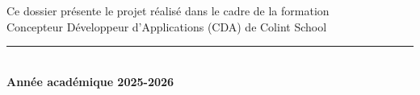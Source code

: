 \documentclass[11pt,a4paper]{book}
\begin{document}
\begin{titlepage}
    \vfill

    \begin{minipage}[b]{\textwidth}
        \centering
        {\small\color{colintDark}
        Ce dossier présente le projet réalisé dans le cadre de la formation\\
        Concepteur Développeur d'Applications (CDA) de Colint School\\
        \vspace{0.2cm}
        \rule{6cm}{0.5pt}\\
        \textbf{Année académique 2025-2026}
        }
    \end{minipage}

    \vspace{1cm}
\end{titlepage}

\tableofcontents
\newpage














\end{document}
